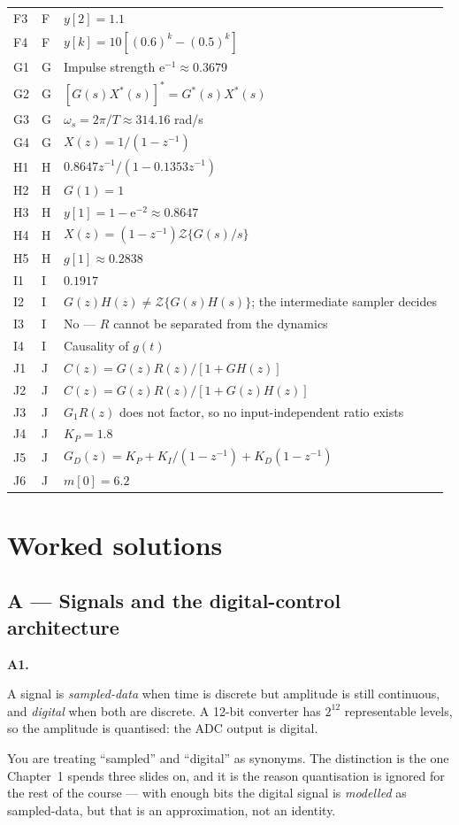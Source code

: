 \documentclass[10pt]{article}
\newcommand{\Z}{\mathcal{Z}}
\newcommand{\e}{\mathrm{e}}
\newcommand{\src}[1]{{\small\color{gray}[PDF pp.~#1]}}
\newcommand{\itemhead}[2]{\par\medskip\noindent\textbf{#1}\quad\src{#2}\par\nopagebreak}
\newcommand{\wrong}[1]{\par\smallskip\noindent{\color{red!55!black}\textbf{If you missed it.}} #1\par}
\begin{document}
\begin{longtable}{@{}llp{95mm}@{}}
F3 & F & \(y[2]=1.1\) \\
F4 & F & \(y[k]=10\left[(0.6)^{k}-(0.5)^{k}\right]\) \\
\midrule
G1 & G & Impulse strength \(\e^{-1}\approx 0.3679\) \\
G2 & G & \(\left[G(s)X^{*}(s)\right]^{*}=G^{*}(s)X^{*}(s)\) \\
G3 & G & \(\omega_{s}=2\pi/T\approx 314.16\) rad/s \\
G4 & G & \(X(z)=1/(1-z^{-1})\) \\
\midrule
H1 & H & \(0.8647z^{-1}/(1-0.1353z^{-1})\) \\
H2 & H & \(G(1)=1\) \\
H3 & H & \(y[1]=1-\e^{-2}\approx 0.8647\) \\
H4 & H & \(X(z)=(1-z^{-1})\Z\{G(s)/s\}\) \\
H5 & H & \(g[1]\approx 0.2838\) \\
\midrule
I1 & I & \(0.1917\) \\
I2 & I & \(G(z)H(z)\neq\Z\{G(s)H(s)\}\); the intermediate sampler decides \\
I3 & I & No --- \(R\) cannot be separated from the dynamics \\
I4 & I & Causality of \(g(t)\) \\
\midrule
J1 & J & \(C(z)=G(z)R(z)/\left[1+GH(z)\right]\) \\
J2 & J & \(C(z)=G(z)R(z)/\left[1+G(z)H(z)\right]\) \\
J3 & J & \(G_{1}R(z)\) does not factor, so no input-independent ratio exists \\
J4 & J & \(K_{P}=1.8\) \\
J5 & J & \(G_{D}(z)=K_{P}+K_{I}/(1-z^{-1})+K_{D}(1-z^{-1})\) \\
J6 & J & \(m[0]=6.2\) \\
\bottomrule
\end{longtable}

\newpage
\section{Worked solutions}

\subsection{A --- Signals and the digital-control architecture}

\itemhead{A1.}{13--16}
A signal is \emph{sampled-data} when time is discrete but amplitude is still
continuous, and \emph{digital} when both are discrete. A 12-bit converter has
\(2^{12}\) representable levels, so the amplitude is quantised: the ADC output is
digital.
\wrong{You are treating ``sampled'' and ``digital'' as synonyms. The distinction is
the one Chapter~1 spends three slides on, and it is the reason quantisation is
ignored for the rest of the course --- with enough bits the digital signal is
\emph{modelled} as sampled-data, but that is an approximation, not an identity.}
\end{document}
